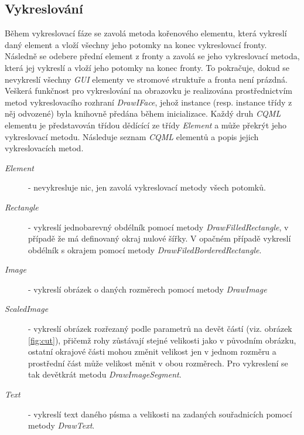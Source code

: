 \documentclass[11pt,twoside,a4paper]{book}
\begin{document}
{{\begin{ttemize}
{{\begin{lastlisting}[frame=single,caption=Řešení v pseudokódu problematického použití operátoru "." v přiřazovacím výroku,label=lst:var0N]
\subsection{Vykreslování}
Během vykreslovací fáze se zavolá metoda kořenového elementu, která vykreslí daný element a vloží všechny jeho potomky na konec vykreslovací fronty. Následně se odebere přední element z fronty a zavolá se jeho vykreslovací metoda, která jej vykreslí a vloží jeho potomky na konec fronty. To pokračuje, dokud se nevykreslí všechny \textit{GUI} elementy ve stromové struktuře a fronta není prázdná.\\
Veškerá funkčnost pro vykreslování na obrazovku je realizována prostřednictvím metod vykreslovacího rozhraní \textit{DrawIFace}, jehož instance (resp. instance třídy z něj odvozené) byla knihovně předána během inicializace. Každý druh \textit{CQML} elementu je představován třídou dědícící ze třídy \textit{Element} a může překrýt jeho vykreslovací metodu. Následuje seznam \textit{CQML} elementů a popis jejich vykreslovacích metod.\\
\begin{description}
\item [\textit{Element}] - nevykresluje nic, jen zavolá vykreslovací metody všech potomků.
\item [\textit{Rectangle}] - vykreslí jednobarevný obdélník pomocí metody \textit{DrawFilledRectangle}, v případě že má definovaný okraj nulové šířky. V opačném případě vykreslí obdélník s okrajem pomocí metody \textit{DrawFiledBorderedRectangle}.
\item [\textit{Image}] - vykreslí obrázek o daných rozměrech pomocí metody \textit{DrawImage}
\item [\textit{ScaledImage}] - vykreslí obrázek rozřezaný podle parametrů na devět částí (viz. obrázek \ref{fig:cut}), přičemž rohy zůstávají stejné velikosti jako v původním obrázku, ostatní okrajové části mohou změnit velikost jen v jednom rozměru a prostřední část může velikost měnit v obou rozměrech. Pro vykreslení se tak devětkrát metodu \textit{DrawImageSegment}.
\item [\textit{Text}] - vykreslí text daného písma a velikosti na zadaných souřadnicích pomocí metody \textit{DrawText}.
\end{description}
\begin{figure}[!ht]
\begin{center}

\end{center}
\end{figure}
\end{lastlisting}}}
\end{ttemize}}}
\end{document}
